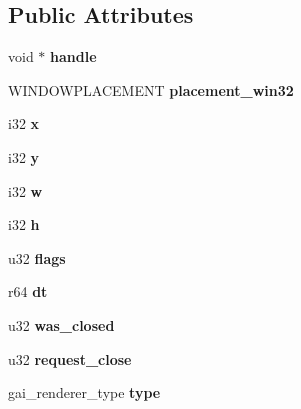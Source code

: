 \subsection*{Public Attributes}
\begin{DoxyCompactItemize}
\item 
\mbox{\label{structgai__window_a9ccc16f8ea46bcf16f97bb7ad6718c5a}} 
void $\ast$ {\bfseries handle}
\item 
\mbox{\label{structgai__window_a8f79768a9175a0700317a60c64a9f1d6}} 
W\+I\+N\+D\+O\+W\+P\+L\+A\+C\+E\+M\+E\+NT {\bfseries placement\+\_\+win32}
\item 
\mbox{\label{structgai__window_a23db179b60e7dfc4d8dfc7792dfb5501}} 
i32 {\bfseries x}
\item 
\mbox{\label{structgai__window_a280b39609526727ad16abf166a6054f1}} 
i32 {\bfseries y}
\item 
\mbox{\label{structgai__window_adb9910632580296999c3785eba2ebc48}} 
i32 {\bfseries w}
\item 
\mbox{\label{structgai__window_a7ae67a6eb8a37a93a56eb2f882531bfa}} 
i32 {\bfseries h}
\item 
\mbox{\label{structgai__window_a7f2295e5b493ee66c97a2e65062db6d1}} 
u32 {\bfseries flags}
\item 
\mbox{\label{structgai__window_aea0a3b7e016ff3ec326f8d9e45a9d321}} 
r64 {\bfseries dt}
\item 
\mbox{\label{structgai__window_a88e46311d090dd0e65c26dfc8bf302e4}} 
u32 {\bfseries was\+\_\+closed}
\item 
\mbox{\label{structgai__window_a10780aa6154e42c0ab7ec981d1ccabae}} 
u32 {\bfseries request\+\_\+close}
\item 
\mbox{\label{structgai__window_a8e7a2d4309b6eb57601aa7e79072d1dd}} 
gai\+\_\+renderer\+\_\+type {\bfseries type}
\item 

\end{DoxyCompactItemize}
